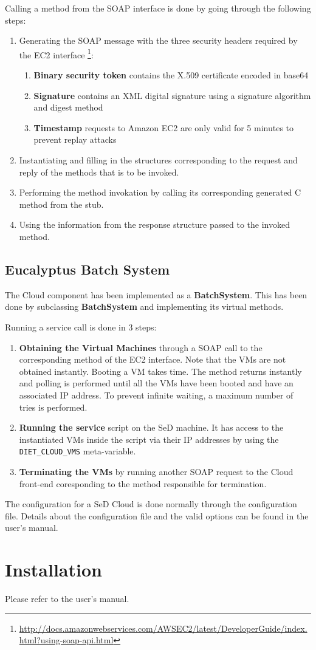 Calling a method from the SOAP interface is done by going through the following steps:
\begin{enumerate}
\item Generating the SOAP message with the three security headers required by the EC2 interface
\footnote{\url{http://docs.amazonwebservices.com/AWSEC2/latest/DeveloperGuide/index.html?using-soap-api.html}}:
\begin{enumerate}
\item \textbf{Binary security token} contains the X.509 certificate encoded in base64
\item \textbf{Signature} contains an XML digital signature using a signature algorithm and digest method
\item \textbf{Timestamp} requests to Amazon EC2 are only valid for 5 minutes to prevent replay attacks
\end{enumerate}
\item Instantiating and filling in the structures corresponding to the request and reply of the methods that is to be invoked.
\item Performing the method invokation by calling its corresponding generated C method from the stub.
\item Using the information from the response structure passed to the invoked method.
\end{enumerate}

\subsection{Eucalyptus Batch System}

The Cloud component has been implemented as a \textbf{BatchSystem}. This has been done by subclassing
\textbf{BatchSystem} and implementing its virtual methods.

Running a service call is done in 3 steps:
\begin{enumerate}
\item \textbf{Obtaining the Virtual Machines} through a SOAP call to the corresponding method of the EC2
interface. Note that the VMs are not obtained instantly. Booting a VM takes time. The method returns
instantly and polling is performed until all the VMs have been booted and have an associated IP address.
To prevent infinite waiting, a maximum number of tries is performed.
\item \textbf{Running the service} script on the SeD machine. It has access to the instantiated VMs
inside the script via their IP addresses by using the \verb!DIET_CLOUD_VMS! meta-variable.
\item \textbf{Terminating the VMs} by running another SOAP request to the Cloud front-end coresponding
to the method responsible for termination.
\end{enumerate}

The configuration for a SeD Cloud is done normally through the configuration file. Details about
the configuration file and the valid options can be found in the user's manual.

\section{Installation}

Please refer to the user's manual.


